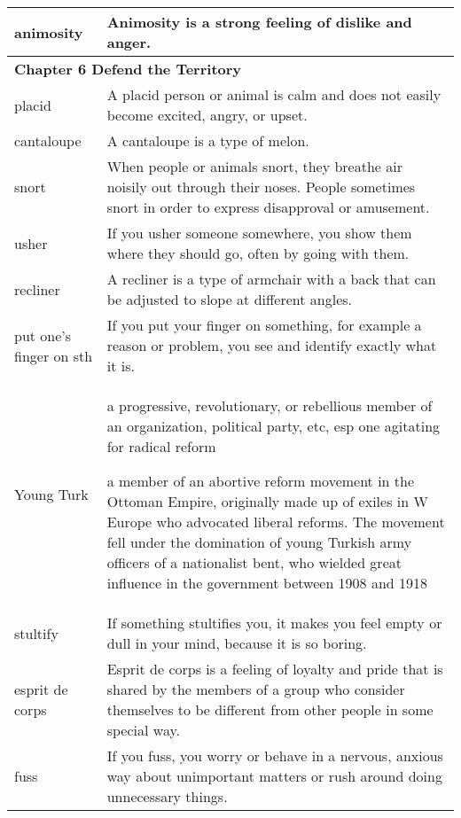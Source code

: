 \documentclass{article}
\begin{document}
\begin{center}
\begin{longtable}{|l|p{9cm}|}
\hline
animosity
&
Animosity is a strong feeling of dislike and anger.
\\

\hline
\multicolumn{2}{|l|}{\textbf{Chapter 6 Defend the Territory}}
\\

\hline
placid
&
A placid person or animal is calm and does not easily become excited, angry, or upset.
\\

\hline
cantaloupe
&
A cantaloupe is a type of melon.
\\

\hline
snort
&
When people or animals snort, they breathe air noisily out through their noses. People sometimes snort in order to express disapproval or amusement.
\\

\hline
usher
&
If you usher someone somewhere, you show them where they should go, often by going with them.
\\

\hline
recliner
&
A recliner is a type of armchair with a back that can be adjusted to slope at different angles.
\\

\hline
put one's finger on sth
&
If you put your finger on something, for example a reason or problem, you see and identify exactly what it is.
\\

\hline
Young Turk
&
a progressive, revolutionary, or rebellious member of an organization, political party, etc, esp one agitating for radical reform
\par
a member of an abortive reform movement in the Ottoman Empire, originally made up of exiles in W Europe who advocated liberal reforms. The movement fell under the domination of young Turkish army officers of a nationalist bent, who wielded great influence in the government between 1908 and 1918
\\

\hline
stultify
&
If something stultifies you, it makes you feel empty or dull in your mind, because it is so boring.
\\

\hline
esprit de corps
&
Esprit de corps is a feeling of loyalty and pride that is shared by the members of a group who consider themselves to be different from other people in some special way.
\\

\hline
fuss
&
If you fuss, you worry or behave in a nervous, anxious way about unimportant matters or rush around doing unnecessary things.
\\


\end{longtable}
\end{center}
\end{document}
